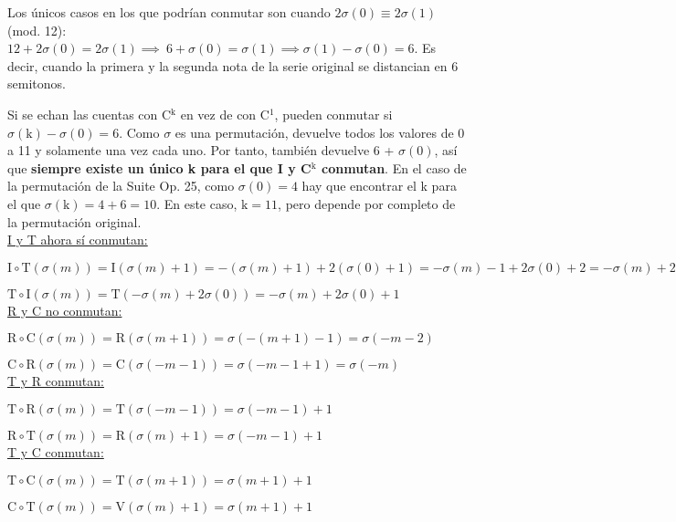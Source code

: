 		Los únicos casos en los que podrían conmutar son cuando $2\sigma\left(0\right)\equiv2\sigma(1)$ (mod. 12): $12+2\sigma\left(0\right)=2\sigma\left(1\right)\implies\ 6+\sigma\left(0\right)=\sigma\left(1\right)\implies \sigma\left(1\right)-\sigma\left(0\right)=6$. Es decir, cuando la primera y la segunda nota de la serie original se distancian en 6 semitonos.
		
		Si se echan las cuentas con C$^\text{k}$ en vez de con C$^1$, pueden conmutar si $\sigma\left(\text{k}\right)-\sigma\left(0\right)=6$. Como $\sigma$ es una permutación, devuelve todos los valores de 0 a 11 y solamente una vez cada uno. Por tanto, también devuelve 6 + $\sigma(0)$, así que \textbf{siempre existe un único k para el que I y C$^\text{k}$ conmutan}. En el caso de la permutación de la Suite Op. 25, como $\sigma\left(0\right)=4$ hay que encontrar el k para el que $\sigma\left(\text{k}\right)=4+6=10$. En este caso, $\text{k}=11$, pero depende por completo de la permutación original.\\
		
		\underline{I y T ahora sí conmutan:}
		
		$\text{I}\circ\text{T}(\sigma(m))=\text{I}(\sigma(m)+1)=-(\sigma(m)+1) + 2(\sigma(0)+1)=-\sigma(m)-1+2\sigma(0)+2=-\sigma(m)+2\sigma(0)+1$
		
		$\text{T}\circ\text{I}(\sigma(m))=\text{T}(-\sigma(m)+2\sigma(0))=-\sigma(m)+2\sigma(0)+1$\\
		
		\underline{R y C no conmutan:}
		
		$\text{R}\circ\text{C}(\sigma(m))=\text{R}(\sigma(m+1))=\sigma(-(m+1)-1)=\sigma(-m-2)$
		
		$\text{C}\circ\text{R}(\sigma(m))=\text{C}(\sigma(-m-1))=\sigma(-m-1+1)=\sigma(-m)$\\
		
		\underline{T y R conmutan:}
		
		$\text{T}\circ\text{R}(\sigma(m))=\text{T}(\sigma(-m-1))=\sigma(-m-1)+1$
		
		$\text{R}\circ\text{T}(\sigma(m))=\text{R}(\sigma(m)+1)=\sigma(-m-1)+1$\\
		
		\underline{T y C conmutan:}
		
		$\text{T}\circ\text{C}(\sigma(m))=\text{T}(\sigma(m+1))=\sigma(m+1)+1$
		
		$\text{C}\circ\text{T}(\sigma(m))=\text{V}(\sigma(m)+1)=\sigma(m+1)+1$
